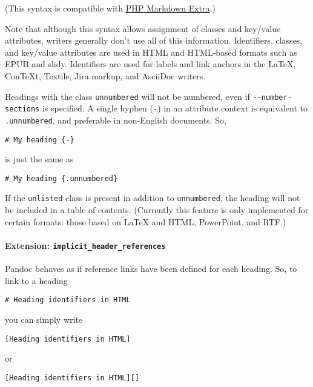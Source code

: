 \documentclass[
]{article}
\begin{document}
(This syntax is compatible with
\href{https://michelf.ca/projects/php-markdown/extra/}{PHP Markdown
Extra}.)

Note that although this syntax allows assignment of classes and
key/value attributes, writers generally don't use all of this
information. Identifiers, classes, and key/value attributes are used in
HTML and HTML-based formats such as EPUB and slidy. Identifiers are used
for labels and link anchors in the LaTeX, ConTeXt, Textile, Jira markup,
and AsciiDoc writers.

Headings with the class \texttt{unnumbered} will not be numbered, even
if \texttt{-\/-number-sections} is specified. A single hyphen
(\texttt{-}) in an attribute context is equivalent to
\texttt{.unnumbered}, and preferable in non-English documents. So,

\begin{verbatim}
# My heading {-}
\end{verbatim}

is just the same as

\begin{verbatim}
# My heading {.unnumbered}
\end{verbatim}

If the \texttt{unlisted} class is present in addition to
\texttt{unnumbered}, the heading will not be included in a table of
contents. (Currently this feature is only implemented for certain
formats: those based on LaTeX and HTML, PowerPoint, and RTF.)

\paragraph{\texorpdfstring{Extension:
\texttt{implicit\_header\_references}}{Extension: implicit\_header\_references}}\label{extension-implicit_header_references}

Pandoc behaves as if reference links have been defined for each heading.
So, to link to a heading

\begin{verbatim}
# Heading identifiers in HTML
\end{verbatim}

you can simply write

\begin{verbatim}
[Heading identifiers in HTML]
\end{verbatim}

or

\begin{verbatim}
[Heading identifiers in HTML][]
\end{verbatim}
\end{document}
